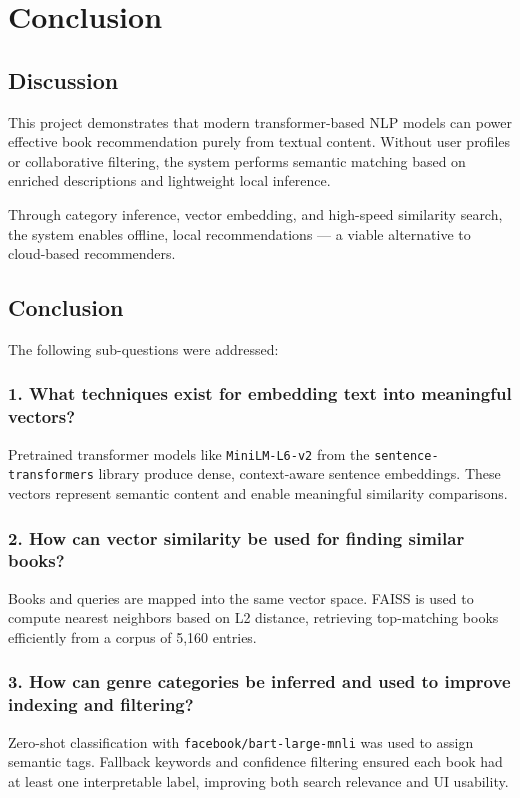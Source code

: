 \chapter{Conclusion}
\label{chapter:conclusion}

\section{Discussion}
\label{sec:discussion}

This project demonstrates that modern transformer-based NLP models can power effective book recommendation purely from textual content. Without user profiles or collaborative filtering, the system performs semantic matching based on enriched descriptions and lightweight local inference.

Through category inference, vector embedding, and high-speed similarity search, the system enables offline, local recommendations — a viable alternative to cloud-based recommenders.

\section{Conclusion}
\label{sec:conclusion}

The following sub-questions were addressed:

\subsection*{1. What techniques exist for embedding text into meaningful vectors?}
Pretrained transformer models like \texttt{MiniLM-L6-v2} from the \texttt{sentence-transformers} library produce dense, context-aware sentence embeddings. These vectors represent semantic content and enable meaningful similarity comparisons.

\subsection*{2. How can vector similarity be used for finding similar books?}
Books and queries are mapped into the same vector space. FAISS is used to compute nearest neighbors based on L2 distance, retrieving top-matching books efficiently from a corpus of 5,160 entries.

\subsection*{3. How can genre categories be inferred and used to improve indexing and filtering?}
Zero-shot classification with \texttt{facebook/bart-large-mnli} was used to assign semantic tags. Fallback keywords and confidence filtering ensured each book had at least one interpretable label, improving both search relevance and UI usability.

